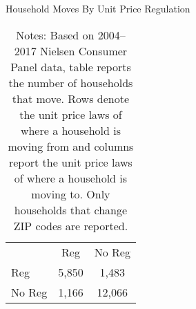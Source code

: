 \begin{table}[!htbp] \centering
\caption{Household Moves By Unit Price Regulation}
\begin{tabular}{lcc}
              & Reg   & No Reg \\
\cline{2-3}
Reg           & 5,850 & 1,483 \\
\cline{2-3}
No Reg        & 1,166 & 12,066 \\
\cline{2-3}
\end{tabular}
\caption*{Notes: Based on 2004--2017 Nielsen Consumer Panel data, table reports the number of households that move. Rows denote the unit price laws of where a household is moving from and columns report the unit price laws of where a household is moving to. Only households that change ZIP codes are reported.}
\end{table}
